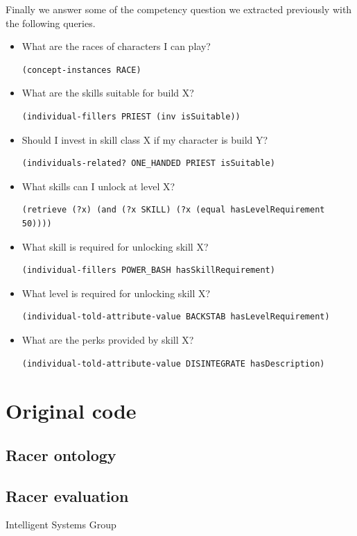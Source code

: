 \documentclass[a4paper,12pt]{report}
\begin{document}
Finally we answer some of the competency question we extracted previously with the following queries.

\begin{itemize}
\item What are the races of characters I can play?
\begin{lstlisting}
(concept-instances RACE)
\end{lstlisting}

\item What are the skills suitable for build X?
\begin{lstlisting}
(individual-fillers PRIEST (inv isSuitable))
\end{lstlisting}

\item Should I invest in skill class X if my character is build Y?
\begin{lstlisting}
(individuals-related? ONE_HANDED PRIEST isSuitable)
\end{lstlisting}

\item What skills can I unlock at level X?
\begin{lstlisting}
(retrieve (?x) (and (?x SKILL) (?x (equal hasLevelRequirement 50))))
\end{lstlisting}

\item What skill is required for unlocking skill X?
\begin{lstlisting}
(individual-fillers POWER_BASH hasSkillRequirement)
\end{lstlisting}

\item What level is required for unlocking skill X?
\begin{lstlisting}
(individual-told-attribute-value BACKSTAB hasLevelRequirement)
\end{lstlisting}

\item What are the perks provided by skill X?
\begin{lstlisting}
(individual-told-attribute-value DISINTEGRATE hasDescription)
\end{lstlisting}
\end{itemize}


\clearpage
\appendix

\chapter{Original code}
\section{Racer ontology}



\section{Racer evaluation}




\vspace{2cm}
\begin{center}
Intelligent Systems Group\\
\end{center}
\end{document}
